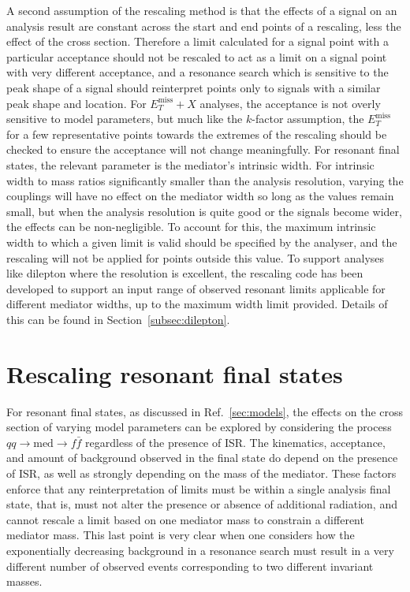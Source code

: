 \documentclass[a4paper, 11pt]{article}
\newcommand{\MET}{\ensuremath{E_T^\mathrm{miss}}\xspace}
\newcommand{\metplusx}{\ensuremath{\MET+X}\xspace}
\begin{document}
A second assumption of the rescaling method is that the effects of a signal on an analysis result are constant across the start and end points of a rescaling, less the effect of the cross section. Therefore a limit calculated for a signal point with a particular acceptance should not be rescaled to act as a limit on a signal point with very different acceptance, and a resonance search which is sensitive to the peak shape of a signal should reinterpret points only to signals with a similar peak shape and location. For \metplusx analyses, the acceptance is not overly sensitive to model parameters, but much like the $k$-factor assumption, the \MET for a few representative points towards the extremes of the rescaling should be checked to ensure the acceptance will not change meaningfully. For resonant final states, the relevant parameter is the mediator's intrinsic width. For intrinsic width to mass ratios significantly smaller than the analysis resolution, varying the couplings will have no effect on the mediator width so long as the values remain small, but when the analysis resolution is quite good or the signals become wider, the effects can be non-negligible. To account for this, the maximum intrinsic width to which a given limit is valid should be specified by the analyser, and the rescaling will not be applied for points outside this value. To support analyses like dilepton where the resolution is excellent, the rescaling code has been developed to support an input range of observed resonant limits applicable for different mediator widths, up to the maximum width limit provided. Details of this can be found in Section~\ref{subsec:dilepton}.

\section{Rescaling resonant final states}
\label{sec:resonant}

For resonant final states, as discussed in Ref.~\ref{sec:models}, the effects on the cross section of varying model parameters can be explored by considering the process $qq\rightarrow \text{med} \rightarrow f \bar{f}$ regardless of the presence of ISR. The kinematics, acceptance, and amount of background observed in the final state do depend on the presence of ISR, as well as strongly depending on the mass of the mediator. These factors enforce that any reinterpretation of limits must be within a single analysis final state, that is, must not alter the presence or absence of additional radiation, and cannot rescale a limit based on one mediator mass to constrain a different mediator mass. This last point is very clear when one considers how the exponentially decreasing background in a resonance search must result in a very different number of observed events corresponding to two different invariant masses. 
\end{document}
